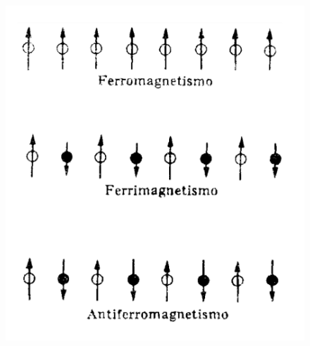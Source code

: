 \begin{footnotesize}
\begin{figure}[H]
	\centering
	\includegraphics[width=.6\textwidth]{imagenes/imagenes28/T28IM08.png}
\end{figure}

\end{footnotesize}


